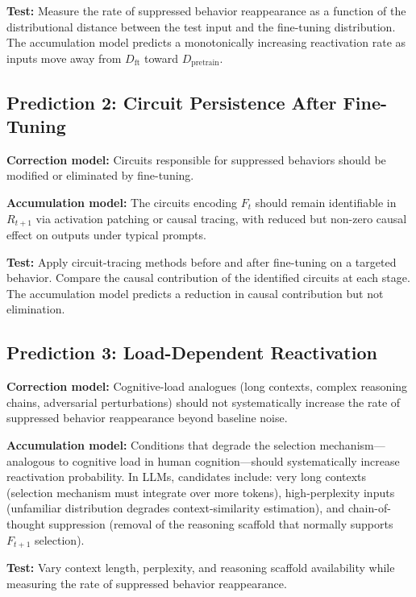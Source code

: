 \documentclass[12pt]{article}
\begin{document}
\textbf{Test:} Measure the rate of suppressed behavior reappearance
as a function of the distributional distance between the test input
and the fine-tuning distribution. The accumulation model predicts
a monotonically increasing reactivation rate as inputs move
away from $D_{\mathrm{ft}}$ toward $D_{\mathrm{pretrain}}$.

\subsection{Prediction 2: Circuit Persistence After Fine-Tuning}

\textbf{Correction model:} Circuits responsible for suppressed
behaviors should be modified or eliminated by fine-tuning.

\textbf{Accumulation model:} The circuits encoding $F_t$ should
remain identifiable in $R_{t+1}$ via activation patching or
causal tracing, with reduced but non-zero causal effect on
outputs under typical prompts.

\textbf{Test:} Apply circuit-tracing methods \cite{anthropic2025circuit,
conmy2023towards} before and after fine-tuning on a targeted
behavior. Compare the causal contribution of the identified
circuits at each stage. The accumulation model predicts a
reduction in causal contribution but not elimination.

\subsection{Prediction 3: Load-Dependent Reactivation}

\textbf{Correction model:} Cognitive-load analogues (long contexts,
complex reasoning chains, adversarial perturbations) should not
systematically increase the rate of suppressed behavior reappearance
beyond baseline noise.

\textbf{Accumulation model:} Conditions that degrade the selection
mechanism---analogous to cognitive load in human cognition---should
systematically increase reactivation probability. In LLMs,
candidates include: very long contexts (selection mechanism must
integrate over more tokens), high-perplexity inputs (unfamiliar
distribution degrades context-similarity estimation), and
chain-of-thought suppression (removal of the reasoning scaffold
that normally supports $F_{t+1}$ selection).

\textbf{Test:} Vary context length, perplexity, and reasoning
scaffold availability while measuring the rate of suppressed
behavior reappearance.
\end{document}
